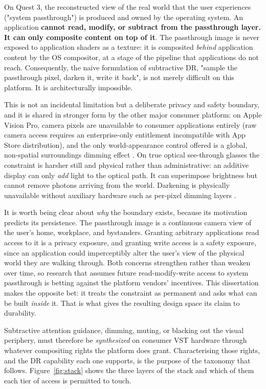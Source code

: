 On Quest 3, the reconstructed view of the real world that the user experiences ("system passthrough")
is produced and owned by the operating system. An application \textbf{cannot read, modify, or subtract from
the passthrough layer. It can only composite content on top of it}. The passthrough image is never
exposed to application shaders as a texture: it is composited \textit{behind} application content by the OS
compositor, at a stage of the pipeline that applications do not reach. Consequently, the naive
formulation of subtractive DR, "sample the passthrough pixel, darken it, write it back", is not
merely difficult on this platform. It is architecturally impossible.

This is not an incidental limitation but a deliberate privacy and safety boundary, and it is shared
in stronger form by the other major consumer platform: on Apple Vision Pro, camera pixels are
unavailable to consumer applications entirely (raw camera access requires an enterprise-only
entitlement incompatible with App Store distribution), and the only world-appearance control offered
is a global, non-spatial surroundings dimming effect \citep{apple2024}. On true optical see-through
glasses the constraint is harsher still and physical rather than administrative: an additive display
can only \textit{add} light to the optical path. It can superimpose brightness but cannot remove photons
arriving from the world. Darkening is physically unavailable without auxiliary hardware such as
per-pixel dimming layers \citep{itoh2021}.

It is worth being clear about \textit{why} the boundary exists, because its motivation predicts its
persistence. The passthrough image is a continuous camera view of the user's home, workplace, and
bystanders. Granting arbitrary applications read access to it is a privacy exposure, and granting
write access is a safety exposure, since an application could imperceptibly alter the user's view of
the physical world they are walking through. Both concerns strengthen rather than weaken over time,
so research that assumes future read-modify-write access to system passthrough is betting against the
platform vendors' incentives. This dissertation makes the opposite bet: it treats the constraint as
permanent and asks what can be built \textit{inside} it. That is what gives the resulting design space
its claim to durability.

Subtractive attention guidance, dimming, muting, or blacking out the visual periphery, must
therefore be \textit{synthesized} on consumer VST hardware through whatever compositing rights the platform
does grant. Characterising those rights, and the DR capability each one supports, is the purpose of
the taxonomy that follows. Figure~\ref{fig:stack} shows the three layers of the stack and which of
them each tier of access is permitted to touch.

